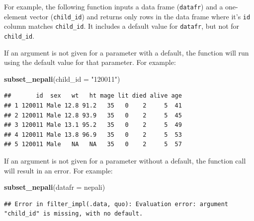 \documentclass[]{book}
\makeatletter
\newenvironment{Shaded}{\begin{snugshade}}{\end{snugshade}}
\newcommand{\KeywordTok}[1]{\textcolor[rgb]{0.13,0.29,0.53}{\textbf{#1}}}
\newcommand{\DataTypeTok}[1]{\textcolor[rgb]{0.13,0.29,0.53}{#1}}
\newcommand{\StringTok}[1]{\textcolor[rgb]{0.31,0.60,0.02}{#1}}
\newcommand{\ControlFlowTok}[1]{\textcolor[rgb]{0.13,0.29,0.53}{\textbf{#1}}}
\newcommand{\OperatorTok}[1]{\textcolor[rgb]{0.81,0.36,0.00}{\textbf{#1}}}
\newcommand{\NormalTok}[1]{#1}
\newenvironment{kframe}{%
\medskip{}
\setlength{\fboxsep}{.8em}
 \def\at@end@of@kframe{}%
 \ifinner\ifhmode%
  \def\at@end@of@kframe{\end{minipage}}%
  \begin{minipage}{\columnwidth}%
 \fi\fi%
 \def\FrameCommand##1{\hskip\@totalleftmargin \hskip-\fboxsep
 \colorbox{shadecolor}{##1}\hskip-\fboxsep
     \hskip-\linewidth \hskip-\@totalleftmargin \hskip\columnwidth}%
 \MakeFramed {\advance\hsize-\width
   \@totalleftmargin\z@ \linewidth\hsize
   \@setminipage}}%
 {\par\unskip\endMakeFramed%
 \at@end@of@kframe}
\renewenvironment{Shaded}{\begin{kframe}}{\end{kframe}}
\theoremstyle{definition}
\theoremstyle{definition}
\theoremstyle{definition}
\theoremstyle{remark}
\makeatother
\begin{document}
For example, the following function inputs a data frame
(\texttt{datafr}) and a one-element vector (\texttt{child\_id}) and
returns only rows in the data frame where it's \texttt{id} column
matches \texttt{child\_id}. It includes a default value for
\texttt{datafr}, but not for \texttt{child\_id}.

\begin{Shaded}
\end{Shaded}

If an argument is not given for a parameter with a default, the function
will run using the default value for that parameter. For example:

\begin{Shaded}
\begin{Highlighting}[]
\KeywordTok{subset_nepali}\NormalTok{(}\DataTypeTok{child_id =} \StringTok{"120011"}\NormalTok{)}
\end{Highlighting}
\end{Shaded}

\begin{verbatim}
##       id  sex   wt   ht mage lit died alive age
## 1 120011 Male 12.8 91.2   35   0    2     5  41
## 2 120011 Male 12.8 93.9   35   0    2     5  45
## 3 120011 Male 13.1 95.2   35   0    2     5  49
## 4 120011 Male 13.8 96.9   35   0    2     5  53
## 5 120011 Male   NA   NA   35   0    2     5  57
\end{verbatim}

If an argument is not given for a parameter without a default, the
function call will result in an error. For example:

\begin{Shaded}
\begin{Highlighting}[]
\KeywordTok{subset_nepali}\NormalTok{(}\DataTypeTok{datafr =}\NormalTok{ nepali)}
\end{Highlighting}
\end{Shaded}

\begin{verbatim}
## Error in filter_impl(.data, quo): Evaluation error: argument "child_id" is missing, with no default.
\end{verbatim}
\end{document}
